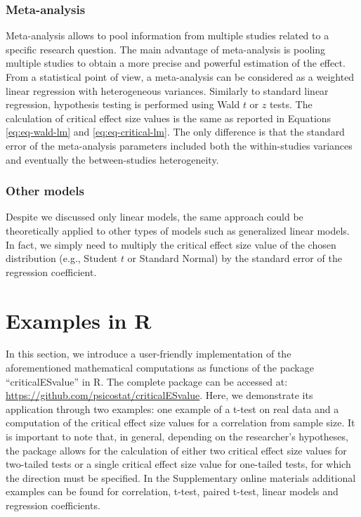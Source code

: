 \documentclass[
  man]{apa7}
\begin{document}
\hypertarget{meta-analysis}{%
\subsubsection{Meta-analysis}\label{meta-analysis}}

Meta-analysis allows to pool information from multiple studies related to a specific research question. The main advantage of meta-analysis is pooling multiple studies to obtain a more precise and powerful estimation of the effect. From a statistical point of view, a meta-analysis can be considered as a weighted linear regression with heterogeneous variances. Similarly to standard linear regression, hypothesis testing is performed using Wald \(t\) or \(z\) tests. The calculation of critical effect size values is the same as reported in Equations \eqref{eq:eq-wald-lm} and \eqref{eq:eq-critical-lm}. The only difference is that the standard error of the meta-analysis parameters included both the within-studies variances and eventually the between-studies heterogeneity.

\hypertarget{other-models}{%
\subsubsection{Other models}\label{other-models}}

Despite we discussed only linear models, the same approach could be theoretically applied to other types of models such as generalized linear models. In fact, we simply need to multiply the critical effect size value of the chosen distribution (e.g., Student \(t\) or Standard Normal) by the standard error of the regression coefficient.

\hypertarget{examples-in-r}{%
\section{Examples in R}\label{examples-in-r}}

In this section, we introduce a user-friendly implementation of the aforementioned mathematical computations as functions of the package ``criticalESvalue'' in R. The complete package can be accessed at: \url{https://github.com/psicostat/criticalESvalue}. Here, we demonstrate its application through two examples: one example of a t-test on real data and a computation of the critical effect size values for a correlation from sample size. It is important to note that, in general, depending on the researcher's hypotheses, the package allows for the calculation of either two critical effect size values for two-tailed tests or a single critical effect size value for one-tailed tests, for which the direction must be specified. In the Supplementary online materials additional examples can be found for correlation, t-test, paired t-test, linear models and regression coefficients.
\end{document}
